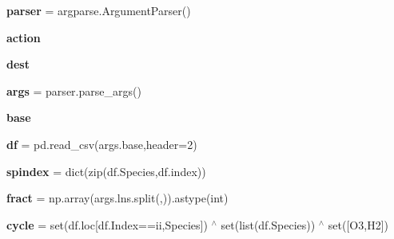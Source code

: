 \begin{DoxyCompactItemize}
\item 
\mbox{\label{namespacezics__sense_a0b86fb7dc35a934cac6607114ff488c4}} 
{\bfseries parser} = argparse.\+Argument\+Parser()
\item 
\mbox{\label{namespacezics__sense_a3e1365c342fb39d0865c74219f128059}} 
{\bfseries action}
\item 
\mbox{\label{namespacezics__sense_a3a8d787d09f3072c4da32f4850ed7a63}} 
{\bfseries dest}
\item 
\mbox{\label{namespacezics__sense_adef40f72d755c60b3834d59da57e3c63}} 
{\bfseries args} = parser.\+parse\+\_\+args()
\item 
\mbox{\label{namespacezics__sense_a0b64f0a08edce8c043be82215c0f8355}} 
{\bfseries base}
\item 
\mbox{\label{namespacezics__sense_a84e505a5d3bdcc6f2e621b2042855195}} 
{\bfseries df} = pd.\+read\+\_\+csv(args.\+base,header=2)
\item 
\mbox{\label{namespacezics__sense_af61f3e9eb7ddd012de351dee35b45895}} 
{\bfseries spindex} = dict(zip(df.\+Species,df.\+index))
\item 
\mbox{\label{namespacezics__sense_ad8677e68746b56bdf1223e74a980342f}} 
{\bfseries fract} = np.\+array(args.\+lns.\+split(\textquotesingle{},\textquotesingle{})).astype(\textquotesingle{}int\textquotesingle{})
\item 
\mbox{\label{namespacezics__sense_aeaebb25fa4cf8e82c0bd77e4f9da3e10}} 
{\bfseries cycle} = set(df.\+loc\mbox{[}df.\+Index==\textquotesingle{}ii\textquotesingle{},\textquotesingle{}Species\textquotesingle{}\mbox{]}) $^\wedge$ set(list(df.\+Species)) $^\wedge$ set(\mbox{[}\textquotesingle{}O3\textquotesingle{},\textquotesingle{}H2\textquotesingle{}\mbox{]})
\item 
\mbox{\label{namespacezics__sense_a54fc15cb9bfa5a6a62256cf84a935e5c}} 

\end{DoxyCompactItemize}
